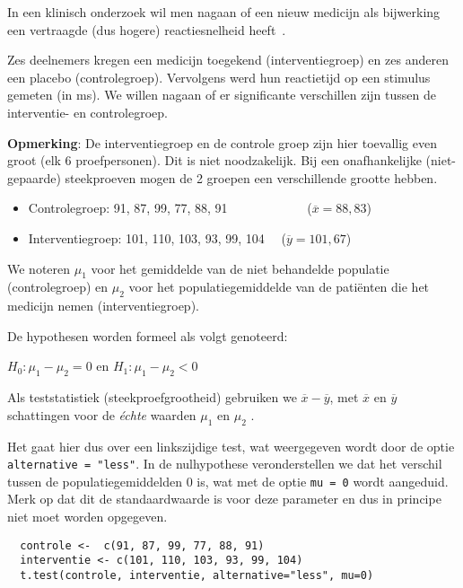 \begin{example}
  In een klinisch onderzoek wil men nagaan of een nieuw medicijn als bijwerking een vertraagde (dus hogere) reactiesnelheid heeft~\autocite{Lindquist}.
  
  Zes deelnemers kregen een medicijn toegekend (interventiegroep) en zes anderen een placebo (controlegroep). Vervolgens werd hun reactietijd op een stimulus gemeten (in ms). We willen nagaan of er significante verschillen zijn tussen de interventie- en controlegroep.
  
  \textbf{Opmerking}: De interventiegroep en de controle groep zijn hier toevallig even groot (elk 6 proefpersonen).
  Dit is niet noodzakelijk. Bij een onafhankelijke (niet-gepaarde) steekproeven
  mogen de 2 groepen een verschillende grootte hebben.
  
  \begin{itemize}
    \item Controlegroep: 91, 87, 99, 77, 88, 91 ~~~~~~~~~~~~($\overline{x}=88,83$)
    \item Interventiegroep: 101, 110, 103, 93, 99, 104 ~~($\overline{y}=101,67$)
  \end{itemize}
  
  We noteren $\mu_1$ voor het gemiddelde van de niet behandelde populatie (controlegroep) en $\mu_2$ voor het populatiegemiddelde van de patiënten die het medicijn nemen (interventiegroep).
  
  De hypothesen worden formeel als volgt genoteerd:
  
  $H_0: \mu_1 - \mu_2 = 0$ en $H_1: \mu_1 - \mu_2 < 0$
  
  Als teststatistiek (steekproefgrootheid) gebruiken we $\overline{x}-\overline{y}$, met $\overline{x}$ en $\overline{y}$ schattingen voor de \textit{\'echte} waarden $\mu_1$ en $\mu_2$ .
  
  Het gaat hier dus over een linkszijdige test, wat weergegeven wordt door de optie \texttt{alternative = "less"}. In de nulhypothese veronderstellen we dat het verschil tussen de populatiegemiddelden 0 is, wat met de optie \texttt{mu = 0} wordt aangeduid. Merk op dat dit de standaardwaarde is voor deze parameter en dus in principe niet moet worden opgegeven.
  
  \begin{lstlisting}
  controle <-  c(91, 87, 99, 77, 88, 91)
  interventie <- c(101, 110, 103, 93, 99, 104)
  t.test(controle, interventie, alternative="less", mu=0)
  \end{lstlisting}
  

\end{example}
